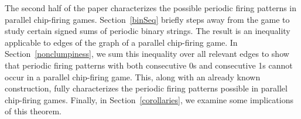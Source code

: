 The second half of the paper characterizes the possible periodic firing
patterns in parallel chip-firing games. Section~\ref{binSeq} briefly steps away
from the game to study certain signed sums of periodic binary strings. The
result is an inequality applicable to edges of the graph of a parallel
chip-firing game. In Section~\ref{nonclumpiness}, we sum this inequality over
all relevant edges to show that periodic firing patterns with both consecutive
0s and consecutive 1s cannot occur in a parallel chip-firing game. This, along
with an already known construction, fully characterizes the periodic firing
patterns possible in parallel chip-firing games. Finally, in
Section~\ref{corollaries}, we examine some implications of this theorem.
